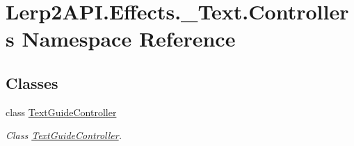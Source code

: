\hypertarget{namespace_lerp2_a_p_i_1_1_effects_1_1___text_1_1_controllers}{}\section{Lerp2\+A\+P\+I.\+Effects.\+\_\+\+Text.\+Controllers Namespace Reference}
\label{namespace_lerp2_a_p_i_1_1_effects_1_1___text_1_1_controllers}
\subsection*{Classes}
\begin{DoxyCompactItemize}
\item 
class \hyperlink{class_lerp2_a_p_i_1_1_effects_1_1___text_1_1_controllers_1_1_text_guide_controller}{Text\+Guide\+Controller}
\begin{DoxyCompactList}\small\item\em Class \hyperlink{class_lerp2_a_p_i_1_1_effects_1_1___text_1_1_controllers_1_1_text_guide_controller}{Text\+Guide\+Controller}. \end{DoxyCompactList}\end{DoxyCompactItemize}
